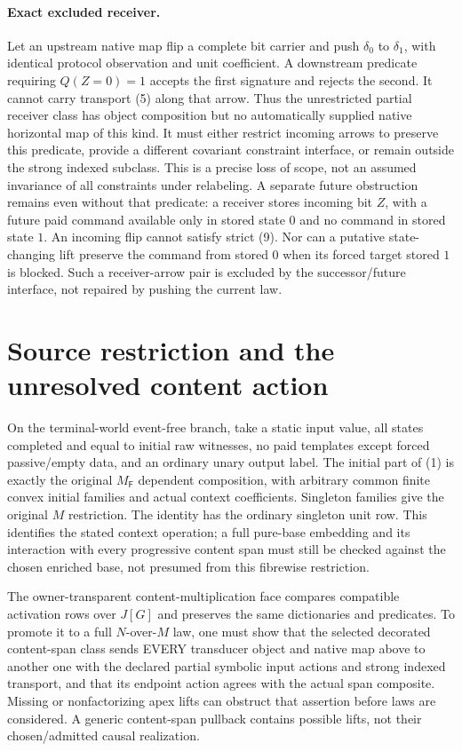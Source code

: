 \documentclass[11pt]{article}\usepackage{amsmath,amssymb,amsthm,geometry}\geometry{margin=1in}
\begin{document}
\paragraph{Exact excluded receiver.}
Let an upstream native map flip a complete bit carrier and push $\delta_0$ to $\delta_1$, with identical protocol observation and unit coefficient. A downstream predicate requiring $Q(Z=0)=1$ accepts the first signature and rejects the second. It cannot carry transport (5) along that arrow. Thus the unrestricted partial receiver class has object composition but no automatically supplied native horizontal map of this kind. It must either restrict incoming arrows to preserve this predicate, provide a different covariant constraint interface, or remain outside the strong indexed subclass. This is a precise loss of scope, not an assumed invariance of all constraints under relabeling. A separate future obstruction remains even without that predicate: a receiver stores incoming bit $Z$, with a future paid command available only in stored state $0$ and no command in stored state $1$. An incoming flip cannot satisfy strict (9). Nor can a putative state-changing lift preserve the command from stored $0$ when its forced target stored $1$ is blocked. Such a receiver-arrow pair is excluded by the successor/future interface, not repaired by pushing the current law.

\section{Source restriction and the unresolved content action}
On the terminal-world event-free branch, take a static input value, all states completed and equal to initial raw witnesses, no paid templates except forced passive/empty data, and an ordinary unary output label. The initial part of (1) is exactly the original $M_{\mathsf F}$ dependent composition, with arbitrary common finite convex initial families and actual context coefficients. Singleton families give the original $M$ restriction. The identity has the ordinary singleton unit row. This identifies the stated context operation; a full pure-base embedding and its interaction with every progressive content span must still be checked against the chosen enriched base, not presumed from this fibrewise restriction.

The owner-transparent content-multiplication face compares compatible activation rows over $J[G]$ and preserves the same dictionaries and predicates. To promote it to a full $N$-over-$M$ law, one must show that the selected decorated content-span class sends EVERY transducer object and native map above to another one with the declared partial symbolic input actions and strong indexed transport, and that its endpoint action agrees with the actual span composite. Missing or nonfactorizing apex lifts can obstruct that assertion before laws are considered. A generic content-span pullback contains possible lifts, not their chosen/admitted causal realization.
\end{document}

